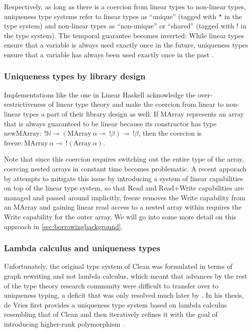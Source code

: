 Respectively, as long as there is a coercion from linear types to non-linear types, uniqueness type systems refer to linear types as ``unique'' (tagged with $*$ in the type system) and non-linear types as ``non-unique'' or ``shared'' (tagged with $!$ in the type system). The temporal guarantee becomes inverted: While linear types ensure that a variable is always used exactly once in the future, uniqueness types ensure that a variable has always been used exactly once in the past \citep{vries_making_2009}\citep{sergey_linearity_2022}.

\subsubsection{Uniqueness types by library design}
Implementations like the one in Linear Haskell \citep{bernardy_linear_2018} acknowledge the over-restrictiveness of linear type theory and make the coercion from linear to non-linear types a part of their library design as well: If MArray represents an array that is always guaranteed to be linear because its constructor has type $\mathrm{newMArray} :\ !\mathbb{N} \multimap (\mathrm{MArray}\ \alpha \multimap\ !\beta) \multimap\ !\beta$, then the coercion is $\mathrm{freeze} : \mathrm{MArray}\ \alpha \multimap\ !(\mathrm{Array}\ \alpha)$. 

Note that since this coercion requires switching out the entire type of the array, coercing nested arrays in constant time becomes problematic. A recent apporach by \cite{spiwack_linearly_2022} attempts to mitigate this issue by introducing a system of linear capabilities on top of the linear type system, so that Read and Read+Write capabilities are managed and passed around implicitly, freeze removes the Write capability from an MArray and gaining linear read access to a nested array within requires the Write capability for the outer array. We will go into some more detail on this approach in \cref{sec:borrowingbackground}.

\subsubsection{Lambda calculus and uniqueness types}
Unfortunately, the original type system of Clean was formulated in terms of graph rewriting and not lambda calculus, which meant that advances by the rest of the type theory research community were difficult to transfer over to uniqueness typing, a deficit that was only resolved much later by \cite{vries_making_2009}. In his thesis, de Vries first provides a uniqueness type system based on lambda calculus resembling that of Clean and then iteratively refines it with the goal of introducing higher-rank polymorphism \citep{peyton_jones_practical_2007}.

